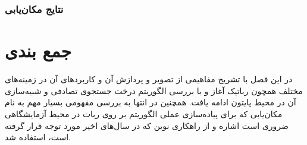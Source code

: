 \section*{}
\begin{latin}
	
\end{latin}


\subsubsection{نتایج مکان‌یابی}
\section{جمع بندی}
در این فصل با تشریح مفاهیمی از تصویر و پردازش آن و کاربرد‌های آن در زمینه‌های مختلف همچون رباتیک آغاز و با بررسی الگوریتم درخت جستجوی تصادفی و شبیه‌سازی آن در محیط پایتون ادامه یافت. همچنین در انتها به بررسی مفهومی بسیار مهم به نام مکان‌یابی که برای پیاده‌سازی عملی الگوریتم بر روی ربات در محیط آزمایشگاهی ضروری است اشاره و از راهکاری نوین که در سال‌های اخیر مورد توجه قرار گرفته است، استفاده شد.
